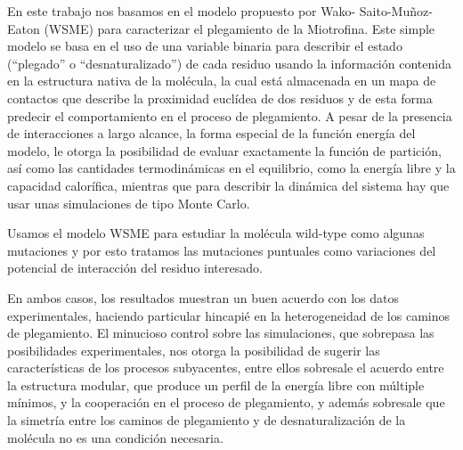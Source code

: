 En este trabajo nos basamos en el modelo propuesto por Wako- Saito-Mu\~noz-Eaton
(WSME) 
para caracterizar el plegamiento de la Miotrofina.
Este simple modelo se basa en el uso de una variable binaria para describir el estado
(``plegado'' o ``desnaturalizado'') de cada residuo usando la información
contenida en la estructura nativa de la molécula, la cual está almacenada en un mapa de
contactos que describe la proximidad euclídea de dos residuos y de esta forma predecir el
comportamiento en el proceso de plegamiento.
A pesar de la presencia de interacciones a largo alcance, la forma especial de la función energía
del modelo, le otorga la posibilidad de evaluar exactamente la
función de partición, así como las cantidades termodinámicas en el equilibrio, como
la energía libre y la capacidad calorífica, mientras que para describir la dinámica
del sistema hay que usar unas simulaciones de tipo Monte Carlo.

Usamos el modelo WSME para estudiar la molécula wild-type como algunas
mutaciones y por esto tratamos las mutaciones puntuales como variaciones del potencial
de interacción del residuo interesado.

En ambos casos, los resultados muestran un buen acuerdo con los datos
experimentales, haciendo particular hincapié en la heterogeneidad de los caminos de
plegamiento.
El minucioso control sobre las simulaciones, que sobrepasa las posibilidades
experimentales, nos otorga la posibilidad de sugerir las caracter\'isticas de los
procesos subyacentes, entre ellos sobresale el acuerdo entre la estructura modular, 
que produce un
perfil de la energía libre con múltiple mínimos, y la cooperaci\'on en el proceso
de plegamiento, y además sobresale que la simetr\'ia entre los caminos de
plegamiento y de desnaturalizaci\'on de la mol\'ecula no es una condición necesaria.



